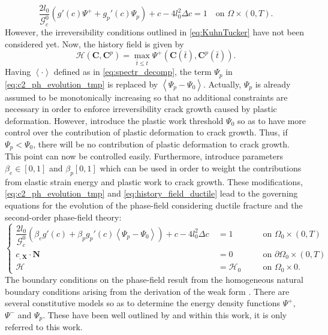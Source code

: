 \begin{equation} \label{eq:c2_ph_evolution_tmp}
\dfrac{2l_{0}}{\mathcal{G}_{c}^{0}}\left(g'\left(c\right)\Psi^{+}+g_{p}'\left(c\right)\Psi_{p}\right) + c - 4l_{0}^{2}\Delta c = 1 \quad\text{on } \Omega\times\left(0,T\right).
\end{equation}
However, the irreversibility conditions outlined in \eqref{eq:KuhnTucker} have not been considered yet. Now, the history field is given by
\begin{equation} \label{eq:history_field_ductile}
	\mathcal{H}\left(\mathbf{C},\mathbf{C}^{p}\right) = \max\limits_{\bar{t}\leq t} \Psi^{+}\left(\mathbf{C}\left(\bar{t}\right),\mathbf{C}^{p}\left(\bar{t}\right)\right).
\end{equation}
Having $\left<\cdot\right>$ defined as in \eqref{eq:spectr_decomp}, the term $\Psi_{p}$ in \eqref{eq:c2_ph_evolution_tmp} is replaced by $\left<\Psi_{p}-\Psi_{0}\right>$. Actually, $\Psi_{p}$ is already assumed to be monotonically increasing so that no additional constraints are necessary in order to enforce irreversibility crack growth caused by plastic deformation. However, \citet{03_PF_ductile} introduce the plastic work threshold $\Psi_{0}$ so as to have more control over the contribution of plastic deformation to crack growth. Thus, if $\Psi_{p}<\Psi_{0}$, there will be no contribution of plastic deformation to crack growth. This point can now be controlled easily. Furthermore, \citet{03_PF_ductile} introduce parameters $\beta_{e}\in\left[0,1\right]$ and $\beta_{p}\left[0,1\right]$ which can be used in order to weight the contributions from elastic strain energy and plastic work to crack growth. These modifications, \eqref{eq:c2_ph_evolution_tmp} and \eqref{eq:history_field_ductile} lead to the governing equations for the evolution of the phase-field considering ductile fracture and the second-order phase-field theory:
\begin{equation} \label{eq:c2_equil_ductile}
	\left\{\begin{alignedat}{2}
		\dfrac{2l_{0}}{\mathcal{G}_{c}^{0}}\left(\beta_{e}g'\left(c\right)+\beta_{p}g_{p}'\left(c\right)\left<\Psi_{p}-\Psi_{0}\right>\right) + c - 4l_{0}^{2}\Delta c\ &= 1 && \quad\text{on } \Omega_{0}\times\left(0,T\right) \\
		c_{,\mathbf{X}}\cdot\mathbf{N} &= 0 && \quad \text{on } \partial\Omega_{0}\times\left(0,T\right) \\
		\mathcal{H} &= \mathcal{H}_{0} && \quad \text{on } \Omega_{0}\times0.
	\end{alignedat}\right.
\end{equation}
The boundary conditions on the phase-field result from the homogeneous natural boundary conditions arising from the derivation of the weak form \citep{11_PF_DissBorden}. \hl{} There are several constitutive models so as to determine the energy density functions $\Psi^{+}$, $\Psi^{-}$ and $\Psi_{p}$. These have been well outlined by \citet{03_PF_ductile} and within this work, it is only referred to this work. 

